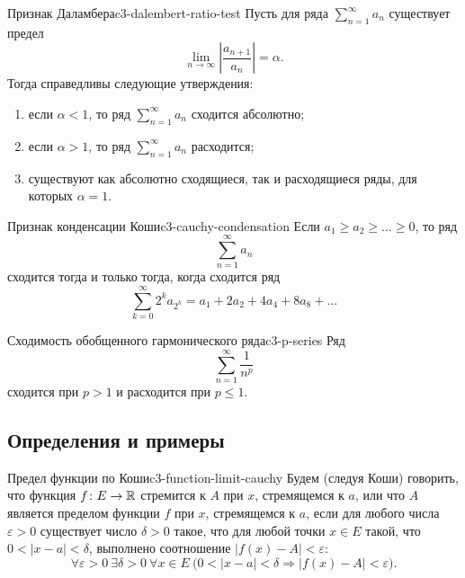 \begin{corollary}{Признак Даламбера}{c3-dalembert-ratio-test}
  Пусть для ряда $\sum\limits_{n=1}^{\infty}a_n$ существует предел
  \[
    \lim_{n\to\infty}\left|\frac{a_{n+1}}{a_n}\right|=\alpha.
  \]
  Тогда справедливы следующие утверждения:
  \begin{enumerate}[label=\alph*)]
    \item если $\alpha<1$, то ряд $\sum\limits_{n=1}^{\infty}a_n$
      сходится абсолютно;
    \item если $\alpha>1$, то ряд $\sum\limits_{n=1}^{\infty}a_n$
      расходится;
    \item существуют как абсолютно сходящиеся, так и расходящиеся ряды,
      для которых $\alpha=1$.
  \end{enumerate}
\end{corollary}

\begin{proposition}{Признак конденсации Коши}{c3-cauchy-condensation}
  Если $a_1\ge a_2\ge\ldots\ge0$, то ряд
  \[
    \sum_{n=1}^{\infty}a_n
  \]
  сходится тогда и только тогда, когда сходится ряд
  \[
    \sum_{k=0}^{\infty}2^k a_{2^k}
    =a_1+2a_2+4a_4+8a_8+\ldots
  \]
\end{proposition}

\begin{corollary}{Сходимость обобщенного гармонического ряда}{c3-p-series}
  Ряд
  \[
    \sum_{n=1}^{\infty}\frac1{n^p}
  \]
  сходится при $p>1$ и расходится при $p\le1$.
\end{corollary}


\subsection{Определения и примеры}

\begin{definition}{Предел функции по Коши}{c3-function-limit-cauchy}
  Будем (следуя Коши) говорить, что функция $f\colon E\to\mathbb{R}$ стремится к
  $A$ при $x$, стремящемся к $a$, или что $A$ является пределом функции $f$
  при $x$, стремящемся к $a$, если для любого числа $\varepsilon>0$
  существует число $\delta>0$ такое, что для любой точки $x\in E$ такой,
  что $0<|x-a|<\delta$, выполнено соотношение $|f(x)-A|<\varepsilon$:
  \[
    \forall\varepsilon>0\ \exists\delta>0\ \forall x\in E\
    \bigl(0<|x-a|<\delta\Rightarrow |f(x)-A|<\varepsilon\bigr).
  \]
\end{definition}

